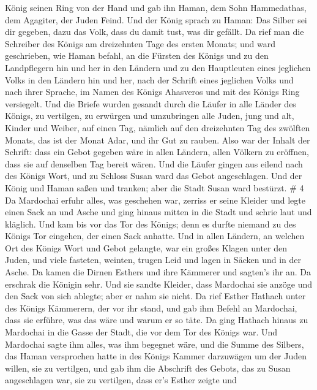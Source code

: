 König seinen Ring von der Hand und gab ihn Haman, dem Sohn Hammedathas,
dem Agagiter, der Juden Feind.  Und der König sprach zu
Haman: Das Silber sei dir gegeben, dazu das Volk, dass du damit tust,
was dir gefällt.  Da rief man die Schreiber des Königs am
dreizehnten Tage des ersten Monats; und ward geschrieben, wie Haman
befahl, an die Fürsten des Königs und zu den Landpflegern hin und her in
den Ländern und zu den Hauptleuten eines jeglichen Volks in den Ländern
hin und her, nach der Schrift eines jeglichen Volks und nach ihrer
Sprache, im Namen des Königs Ahasveros und mit des Königs Ring
versiegelt.  Und die Briefe wurden gesandt durch die Läufer
in alle Länder des Königs, zu vertilgen, zu erwürgen und umzubringen
alle Juden, jung und alt, Kinder und Weiber, auf einen Tag, nämlich auf
den dreizehnten Tag des zwölften Monats, das ist der Monat Adar, und ihr
Gut zu rauben.  Also war der Inhalt der Schrift: dass ein
Gebot gegeben wäre in allen Ländern, allen Völkern zu eröffnen, dass sie
auf denselben Tag bereit wären.  Und die Läufer gingen aus
eilend nach des Königs Wort, und zu Schloss Susan ward das Gebot
angeschlagen. Und der König und Haman saßen und tranken; aber die Stadt
Susan ward bestürzt. \# 4  Da Mardochai erfuhr alles, was
geschehen war, zerriss er seine Kleider und legte einen Sack an und
Asche und ging hinaus mitten in die Stadt und schrie laut und kläglich.
 Und kam bis vor das Tor des Königs; denn es durfte niemand
zu des Königs Tor eingehen, der einen Sack anhatte.  Und in
allen Ländern, an welchen Ort des Königs Wort und Gebot gelangte, war
ein großes Klagen unter den Juden, und viele fasteten, weinten, trugen
Leid und lagen in Säcken und in der Asche.  Da kamen die
Dirnen Esthers und ihre Kämmerer und sagten's ihr an. Da erschrak die
Königin sehr. Und sie sandte Kleider, dass Mardochai sie anzöge und den
Sack von sich ablegte; aber er nahm sie nicht.  Da rief
Esther Hathach unter des Königs Kämmerern, der vor ihr stand, und gab
ihm Befehl an Mardochai, dass sie erführe, was das wäre und warum er so
täte.  Da ging Hathach hinaus zu Mardochai in die Gasse der
Stadt, die vor dem Tor des Königs war.  Und Mardochai sagte
ihm alles, was ihm begegnet wäre, und die Summe des Silbers, das Haman
versprochen hatte in des Königs Kammer darzuwägen um der Juden willen,
sie zu vertilgen,  und gab ihm die Abschrift des Gebots, das
zu Susan angeschlagen war, sie zu vertilgen, dass er's Esther zeigte und
